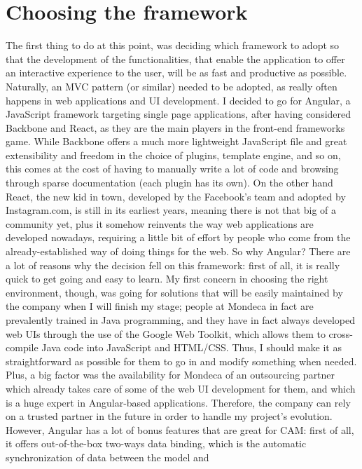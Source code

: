 \documentclass[12pt,svgnames]{memoir}
\begin{document}
\section{Choosing the framework}\label{choosing-the-framework}

The first thing to do at this point, was deciding which framework to
adopt so that the development of the functionalities, that enable the
application to offer an interactive experience to the user, will be as
fast and productive as possible. Naturally, an MVC pattern (or similar)
needed to be adopted, as really often happens in web applications and UI
development. I decided to go for Angular, a JavaScript framework
targeting single page applications, after having considered Backbone and
React, as they are the main players in the front-end frameworks game.
While Backbone offers a much more lightweight JavaScript file and great
extensibility and freedom in the choice of plugins, template engine, and
so on, this comes at the cost of having to manually write a lot of code
and browsing through sparse documentation (each plugin has its own). On
the other hand React, the new kid in town, developed by the Facebook's
team and adopted by Instagram.com, is still in its earliest years,
meaning there is not that big of a community yet, plus it somehow
reinvents the way web applications are developed nowadays, requiring a
little bit of effort by people who come from the already-established way
of doing things for the web. So why Angular? There are a lot of reasons
why the decision fell on this framework: first of all, it is really
quick to get going and easy to learn. My first concern in choosing the
right environment, though, was going for solutions that will be easily
maintained by the company when I will finish my stage; people at Mondeca
in fact are prevalently trained in Java programming, and they have in
fact always developed web UIs through the use of the Google Web Toolkit,
which allows them to cross-compile Java code into JavaScript and
HTML/CSS. Thus, I should make it as straightforward as possible for them
to go in and modify something when needed. Plus, a big factor was the
availability for Mondeca of an outsourcing partner which already takes
care of some of the web UI development for them, and which is a huge
expert in Angular-based applications. Therefore, the company can rely on
a trusted partner in the future in order to handle my project's
evolution. However, Angular has a lot of bonus features that are great
for CAM: first of all, it offers out-of-the-box two-ways data binding,
which is the automatic synchronization of data between the model and
\end{document}
